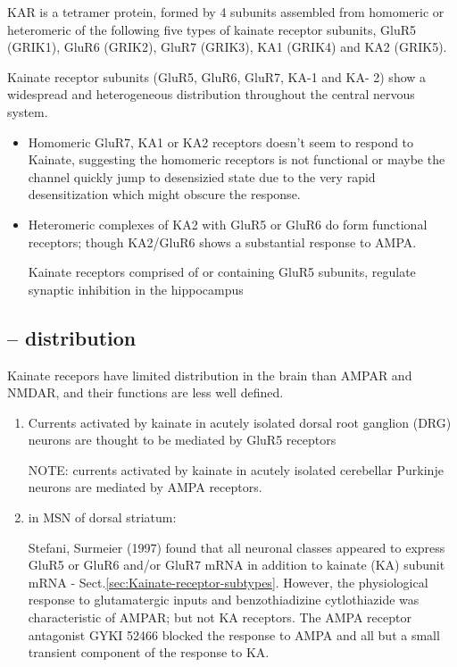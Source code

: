 KAR is a tetramer protein, formed by 4 subunits assembled from
homomeric or heteromeric of the following five types of kainate receptor
subunits, GluR5 (GRIK1), GluR6 (GRIK2), GluR7 (GRIK3), KA1 (GRIK4) and KA2
(GRIK5).

Kainate receptor subunits (GluR5, GluR6, GluR7, KA-1 and KA-
2) show a widespread and heterogeneous distribution throughout the central
nervous system.
\begin{itemize}

  \item  Homomeric GluR7, KA1 or KA2 receptors doesn't seem to respond to
  Kainate, suggesting the homomeric receptors is not functional or maybe the channel
quickly jump to desensizied state due to the very rapid desensitization which
might obscure the response.

  \item Heteromeric complexes of KA2 with GluR5 or GluR6 do form functional
  receptors; though KA2/GluR6 shows a substantial response to AMPA.

Kainate receptors comprised of or containing GluR5 subunits, regulate synaptic
inhibition in the hippocampus

\end{itemize}

\subsection{-- distribution}
\label{sec:kainate-receptor-distribution}

Kainate recepors have limited distribution in the brain than AMPAR and
NMDAR, and their functions are less well defined.
\begin{enumerate}
  \item Currents activated by kainate in acutely isolated dorsal root ganglion
  (DRG) neurons are thought to be mediated by GluR5 receptors

NOTE: currents activated by kainate in acutely isolated cerebellar Purkinje
neurons are mediated by AMPA receptors.
   
   \item in MSN of dorsal striatum:
   
    Stefani, Surmeier (1997) found that all neuronal classes appeared to express
    GluR5 or GluR6 and/or GluR7 mRNA in addition to kainate (KA) subunit mRNA -
    Sect.\ref{sec:Kainate-receptor-subtypes}. However, the physiological
    response to glutamatergic inputs and benzothiadizine cytlothiazide was
    characteristic of AMPAR; but not KA receptors.
    The AMPA receptor antagonist GYKI 52466 blocked the response to AMPA and all
    but a small transient component of the response to KA.
    
    

\end{enumerate}

